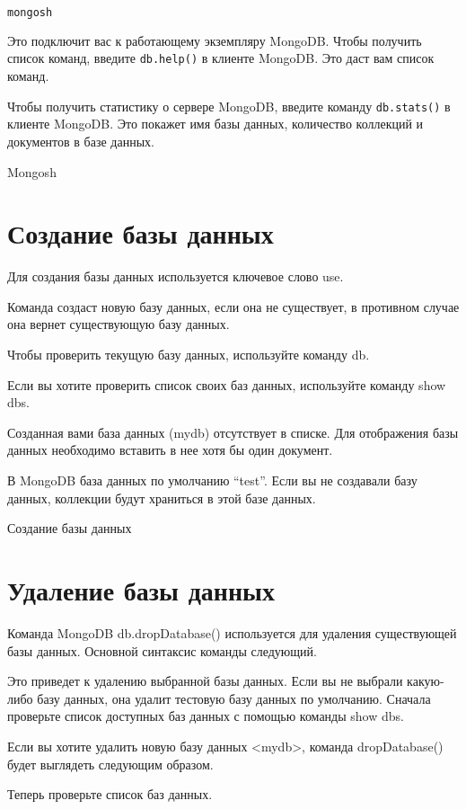 \begin{lstlisting}[language=bash]
mongosh
\end{lstlisting}

Это подключит вас к работающему экземпляру MongoDB.
Чтобы получить список команд, введите \texttt{db.help()} в клиенте
MongoDB. Это даст вам список команд.\par
Чтобы получить статистику о сервере MongoDB, введите
команду \texttt{db.stats()} в клиенте MongoDB. Это покажет имя базы данных,
количество коллекций и документов в базе данных.

\begin{image}
	\caption{Mongosh}
	\label{fig:mongosh}
\end{image}

\clearpage
\section{Создание базы данных}

Для создания базы данных используется ключевое слово use.\par
Команда создаст новую базу данных, если она не существует, в противном
случае она вернет существующую базу данных.\par
Чтобы проверить текущую базу данных, используйте команду db.\par
Если вы хотите проверить список своих баз данных, используйте
команду show dbs.\par
Созданная вами база данных (mydb) отсутствует в списке. Для
отображения базы данных необходимо вставить в нее хотя бы один документ.\par
В MongoDB база данных по умолчанию “test”. Если вы не создавали базу
данных, коллекции будут храниться в этой базе данных.\par

\begin{image}
	\caption{Создание базы данных}
	\label{fig:create:db}
\end{image}

\clearpage
\section{Удаление базы данных}

Команда MongoDB db.dropDatabase() используется для удаления
существующей базы данных. Основной синтаксис команды следующий.\par
Это приведет к удалению выбранной базы данных. Если вы не выбрали
какую-либо базу данных, она удалит тестовую базу данных по умолчанию.
Сначала проверьте список доступных баз данных с помощью
команды show dbs.\par
Если вы хотите удалить новую базу данных <mydb>, команда
dropDatabase() будет выглядеть следующим образом.\par
Теперь проверьте список баз данных.

